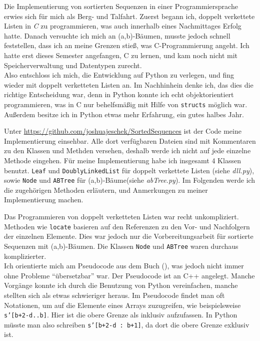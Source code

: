 Die Implementierung von sortierten Sequenzen in einer Programmiersprache erwies sich für mich als Berg- und Talfahrt. Zuerst begann ich, doppelt verkettete Listen in \textit{C} zu programmieren, was auch innerhalb eines Nachmittages Erfolg hatte. Danach versuchte ich mich an (a,b)-Bäumen, musste jedoch schnell feststellen, dass ich an meine Grenzen stieß, was C-Programmierung angeht. Ich hatte erst dieses Semester angefangen, C zu lernen, und kam noch nicht mit Speicherverwaltung und Datentypen zurecht.
\\
Also entschloss ich mich, die Entwicklung auf Python zu verlegen, und fing wieder mit doppelt verketteten Listen an. Im Nachhinhein denke ich, das dies die richtige Entscheidung war, denn in Python konnte ich echt objektorientiert programmieren, was in C nur behelfsmäßig mit Hilfe von \texttt{structs} möglich war. Außerdem besitze ich in Python etwas mehr Erfahrung, ein gutes halbes Jahr.
\par
Unter \url{https://github.com/joshuajeschek/SortedSequences} ist der Code meine Implementierung einsehbar. Alle dort verfügbaren Dateien sind mit Kommentaren zu den Klassen und Methden versehen, deshalb werde ich nicht auf jede einzelne Methode eingehen. Für meine Implementierung habe ich insgesamt 4 Klassen benutzt. \texttt{Leaf} und \texttt{DoublyLinkedList} für doppelt verkettete Listen (siehe \textit{dll.py}), sowie \texttt{Node} und \texttt{ABTree} für (a,b)-Bäume(siehe \textit{abTree.py}). Im Folgenden werde ich die zugehörigen Methoden erläutern, und Anmerkungen zu meiner Implementierung machen.
\par
Das Programmieren von doppelt verketteten Listen war recht unkompliziert. Methoden wie \texttt{locate} basieren auf den Referenzen zu den Vor- und Nachfolgern der einzelnen Elemente. Dies war jedoch nur die Vorbereitungsarbeit für sortierte Sequenzen mit (a,b)-Bäumen. Die Klassen \texttt{Node} und \texttt{ABTree} waren durchaus komplizierter.
\\
Ich orientierte mich am Pseudocode aus dem Buch (\cite{Sanders:19}), was jedoch nicht immer ohne Probleme "`übersetzbar"' war. Der Pseudocode ist an C++ angelegt. Manche Vorgänge konnte ich durch die Benutzung von Python vereinfachen, manche stellten sich als etwas schwieriger heraus. Im Pseudocode findet man oft Notationen, um auf die Elemente eines Arrays zuzugreifen, wie beispielsweise \texttt{s'[b+2-d..b]}. Hier ist die obere Grenze als inklusiv aufzufassen. In Python müsste man also schreiben \texttt{s'[b+2-d : b+1]}, da dort die obere Grenze exklusiv ist.
